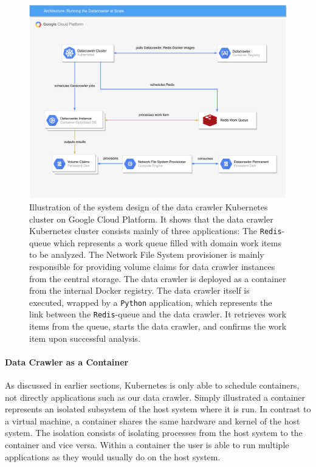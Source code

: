 \begin{figure}
	\centering
	\includegraphics[scale=0.5]{resources/datacrawler_k8s_architecture}
	\caption[System design of "Running the data crawler at Scale"]{Illustration of the system design of the data crawler Kubernetes cluster on Google Cloud Platform. It shows that the data crawler Kubernetes cluster consists mainly of three applications: The \texttt{Redis}-queue which represents a work queue filled with domain work items to be analyzed. The Network File System provisioner is mainly responsible for providing volume claims for data crawler instances from the central storage. The data crawler is deployed as a container from the internal Docker registry. The data crawler itself is executed, wrapped by a \texttt{Python} application, which represents the link between the \texttt{Redis}-queue and the data crawler. It retrieves work items from the queue, starts the data crawler, and confirms the work item upon successful analysis.}
	\label{datacrawler_k8s_architecture}
\end{figure}

\paragraph*{Data Crawler as a Container}
\label{datacrawler_container}

As discussed in earlier sections, Kubernetes is only able to schedule containers, not directly applications such as our data crawler. Simply illustrated a container represents an isolated subsystem of the host system where it is run. In contrast to a virtual machine, a container shares the same hardware and kernel of the host system. The isolation consists of isolating processes from the host system to the container and vice versa. Within a container the user is able to run multiple applications as they would usually do on the host system. 


